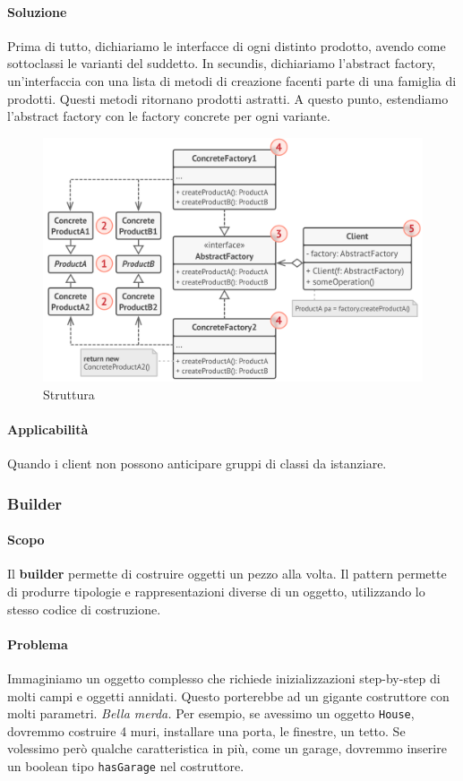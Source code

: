 \documentclass[11pt]{article}
\newcommand{\code}[1]{\texttt{#1}}
\begin{document}
\paragraph{Soluzione}
Prima di tutto, dichiariamo le interfacce di ogni distinto prodotto, avendo come sottoclassi le varianti del suddetto. In secundis, dichiariamo l'abstract factory, un'interfaccia con una lista di metodi di creazione facenti parte di una famiglia di prodotti. Questi metodi ritornano prodotti astratti. A questo punto, estendiamo l'abstract factory con le factory concrete per ogni variante. 
\begin{figure}[H]
    \centering
    \includegraphics[width=\linewidth]{res/teoria/AbstractFactory.png}
    \caption{Struttura}
\end{figure}
\paragraph{Applicabilità}
Quando i client non possono anticipare gruppi di classi da istanziare.
\subsubsection{Builder}
\paragraph{Scopo}
Il \textbf{builder} permette di costruire oggetti un pezzo alla volta. Il pattern permette di produrre tipologie e rappresentazioni diverse di un oggetto, utilizzando lo stesso codice di costruzione.
\paragraph{Problema}
Immaginiamo un oggetto complesso che richiede inizializzazioni step-by-step di molti campi e oggetti annidati. Questo porterebbe ad un gigante costruttore con molti parametri. \textit{Bella merda.} Per esempio, se avessimo un oggetto \code{House}, dovremmo costruire 4 muri, installare una porta, le finestre, un tetto. Se volessimo però qualche caratteristica in più, come un garage, dovremmo inserire un boolean tipo \code{hasGarage} nel costruttore.
\end{document}
